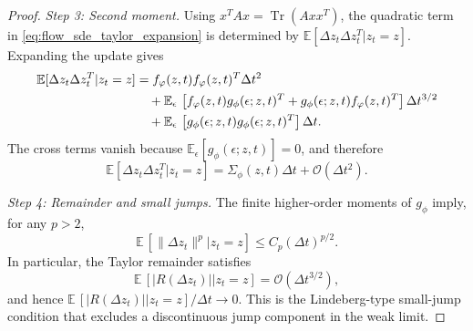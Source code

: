 \begin{proof}
\medskip
\noindent\textit{Step 3: Second moment.}
Using $x^TAx=\operatorname{Tr}(Axx^T)$, the quadratic term in
\eqref{eq:flow_sde_taylor_expansion} is determined by
$\mathbb{E}[\Delta z_t\Delta z_t^T| z_t=z]$. Expanding the update gives
\begin{align}
    \mathbb{E}[\Delta z_t\Delta z_t^T| z_t=z]
    &=
    f_\varphi(z,t)f_\varphi(z,t)^T\Delta t^2 \notag \\
    &\quad
    +\mathbb{E}_{\epsilon}\,\left[
        f_\varphi(z,t)g_\phi(\epsilon;z,t)^T
        +g_\phi(\epsilon;z,t)f_\varphi(z,t)^T
    \right]\Delta t^{3/2} \notag \\
    &\quad
    +\mathbb{E}_{\epsilon}\,\left[
        g_\phi(\epsilon;z,t)g_\phi(\epsilon;z,t)^T
    \right]\Delta t.
\end{align}
The cross terms vanish because $\mathbb{E}_{\epsilon}[g_\phi(\epsilon;z,t)]=0$, and therefore
\begin{equation}
    \mathbb{E}[\Delta z_t\Delta z_t^T| z_t=z]
    =
    \Sigma_\phi(z,t)\Delta t+\mathcal{O}(\Delta t^2).
    \label{eq:flow_sde_second_moment}
\end{equation}

\medskip
\noindent\textit{Step 4: Remainder and small jumps.}
The finite higher-order moments of $g_\phi$ imply, for any $p>2$,
\begin{equation}
    \mathbb{E}\,\left[\|\Delta z_t\|^p| z_t=z\right]
    \leq C_p(\Delta t)^{p/2}.
\end{equation}
In particular, the Taylor remainder satisfies
\begin{equation}
    \mathbb{E}\,\left[|R(\Delta z_t)|| z_t=z\right]
    =\mathcal{O}(\Delta t^{3/2}),
    \label{eq:flow_sde_remainder}
\end{equation}
and hence $\mathbb{E}\,\left[|R(\Delta z_t)|| z_t=z\right]/\Delta t\to 0$. This is the Lindeberg-type small-jump condition that excludes a discontinuous jump component in the weak limit.


\end{proof}
